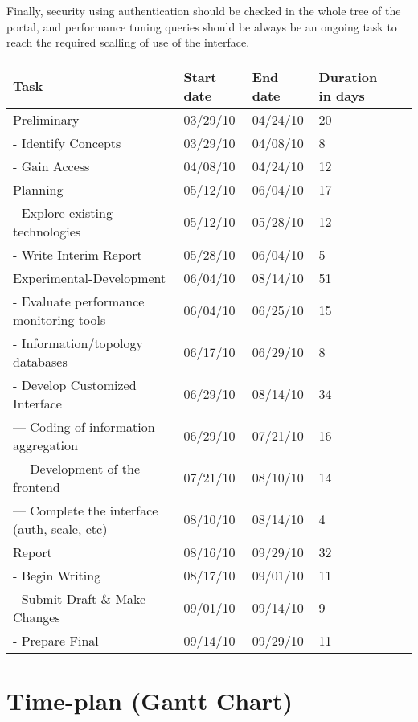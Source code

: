\documentclass[a4paper,12pt,oneside]{book}
\begin{document}
Finally, security
using authentication should be checked in the whole tree of the portal, and
performance tuning queries should be always be an ongoing task to reach the
required scalling of use of the interface.

\begin{table}[ht]
\begin{tabular}{ | l | l | l | l | r |}    
\hline
Task & Start date & End date & Duration in days \\ \hline
  Preliminary & 03/29/10 & 04/24/10 & 20 \\ \hline 
  -  Identify Concepts & 03/29/10 & 04/08/10 & 8 \\ \hline 
  -  Gain Access & 04/08/10 & 04/24/10 & 12 \\ \hline 
  Planning & 05/12/10 & 06/04/10 & 17 \\ \hline 
  -  Explore existing technologies & 05/12/10 & 05/28/10 & 12 \\ \hline 
  -  Write Interim Report & 05/28/10 & 06/04/10 & 5 \\ \hline 
  Experimental-Development & 06/04/10 & 08/14/10 & 51 \\ \hline 
  -  Evaluate performance monitoring tools & 06/04/10 & 06/25/10 & 15 \\ \hline 
  -  Information/topology databases & 06/17/10 & 06/29/10 & 8 \\ \hline 
  -  Develop Customized Interface & 06/29/10 & 08/14/10 & 34 \\ \hline 
  ---    Coding of information aggregation & 06/29/10 & 07/21/10 & 16 \\ \hline 
  ---    Development of the frontend & 07/21/10 & 08/10/10 & 14 \\ \hline 
  ---    Complete the interface (auth, scale, etc) & 08/10/10 & 08/14/10 & 4 \\
      \hline Report & 08/16/10 & 09/29/10 & 32 \\ \hline 
  -  Begin Writing & 08/17/10 & 09/01/10 & 11 \\ \hline 
  -  Submit Draft \& Make Changes & 09/01/10 & 09/14/10 & 9 \\ \hline 
  -  Prepare Final & 09/14/10 & 09/29/10 & 11 \\ \hline 
\end{tabular}
\label{tab:tasks}
\end{table}


\section[Time plan]{Time-plan (Gantt Chart)}
\end{document}
